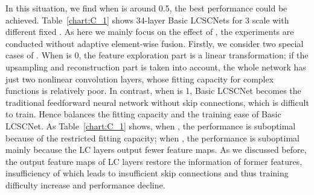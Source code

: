 \documentclass[journal]{IEEEtran}
\begin{document}
In this situation, we find when  is around 0.5, the best performance could be achieved. Table~\ref{chart:C_1} shows 34-layer Basic LCSCNets for 3 scale with different fixed . As here we mainly focus on the effect of , the experiments are conducted without adaptive element-wise fusion. Firstly, we consider two special cases of . When  is 0, the feature exploration part is a linear transformation; if the upsampling and reconstruction part is taken into account, the whole network has just two nonlinear convolution layers, whose fitting capacity for complex functions is relatively poor. In contrast, when  is 1, Basic LCSCNet becomes the traditional feedforward neural network without skip connections, which is difficult to train. Hence  balances the fitting capacity and the training ease of Basic LCSCNet. As Table~\ref{chart:C_1} shows, when , the performance is suboptimal because of the restricted fitting capacity; when , the performance is suboptimal mainly because the LC layers output fewer feature maps. As we discussed before, the output feature maps of LC layers restore the information of former features, insufficiency of which leads to insufficient skip connections and thus training difficulty increase and performance decline.



\begin{table}[htbp]
\centering
{}
\end{table}
\end{document}

